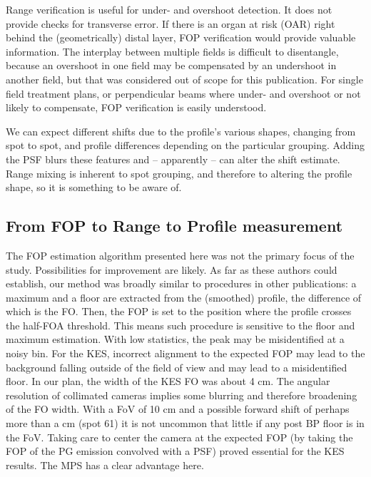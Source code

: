 \documentclass[a4paper,english]{article}
\begin{document}
Range verification is useful for under- and overshoot detection. It does not provide checks for transverse error. If there is an organ at risk (OAR) right behind the (geometrically) distal layer, FOP verification would provide valuable information. The interplay between multiple fields is difficult to disentangle, because an overshoot in one field may be compensated by an undershoot in another field, but that was considered out of scope for this publication. For single field treatment plans, or perpendicular beams where under- and overshoot or not likely to compensate, FOP verification is easily understood.

We can expect different shifts due to the profile's various shapes, changing from spot to spot, and profile differences depending on the particular grouping. %
Adding the PSF blurs these features and -- apparently -- can alter the shift estimate. Range mixing is inherent to spot grouping, and therefore to altering the profile shape, so it is something to be aware of.


\subsection{From FOP to Range to Profile measurement}

The FOP estimation algorithm presented here was not the primary focus of the study. Possibilities for improvement are likely. As far as these authors could establish, our method was broadly similar to procedures in other publications: a maximum and a floor are extracted from the (smoothed) profile, the difference of which is the FO. Then, the FOP is set to the position where the profile crosses the half-FOA threshold. This means such procedure is sensitive to the floor and maximum estimation. With low statistics, the peak may be misidentified at a noisy bin. For the KES, incorrect alignment to the expected FOP may lead to the background falling outside of the field of view and may lead to a misidentified floor. In our plan, the width of the KES FO was about 4 cm. The angular resolution of collimated cameras implies some blurring and therefore broadening of the FO width. With a FoV of 10 cm and a possible forward shift of perhaps more than a cm (spot 61) it is not uncommon that little if any post BP floor is in the FoV. Taking care to center the camera at the expected FOP (by taking the FOP of the PG emission convolved with a PSF) proved essential for the KES results. The MPS has a clear advantage here.
\end{document}
